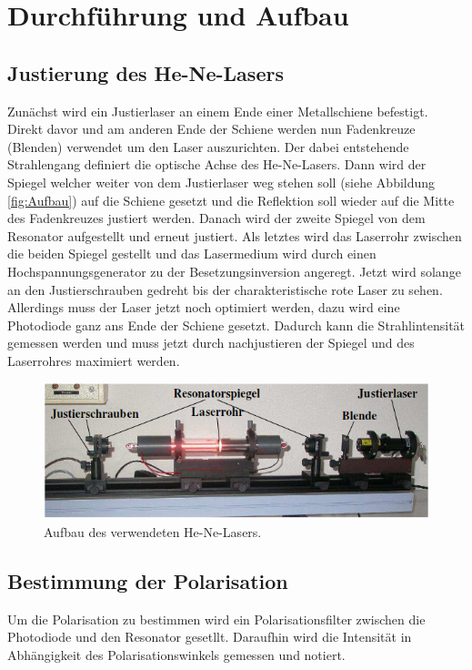 \section{Durchführung und Aufbau}
\label{sec:Durchführung}

\subsection{Justierung des He-Ne-Lasers}
Zunächst wird ein Justierlaser an einem Ende einer Metallschiene befestigt. Direkt davor und am anderen Ende der Schiene werden nun Fadenkreuze (Blenden) verwendet um den Laser auszurichten. Der dabei entstehende Strahlengang definiert die optische Achse des He-Ne-Lasers. Dann wird der Spiegel welcher weiter von dem Justierlaser weg stehen soll (siehe Abbildung \eqref{fig:Aufbau}) auf die Schiene gesetzt und die Reflektion soll wieder auf die Mitte des Fadenkreuzes justiert werden. Danach wird der zweite Spiegel von dem Resonator aufgestellt und erneut justiert. Als letztes wird das Laserrohr zwischen die beiden Spiegel gestellt und das Lasermedium wird durch einen Hochspannungsgenerator zu der Besetzungsinversion angeregt. Jetzt wird solange an den Justierschrauben gedreht bis der charakteristische rote Laser zu sehen. Allerdings muss der Laser jetzt noch optimiert werden, dazu wird eine Photodiode ganz ans Ende der Schiene gesetzt. Dadurch kann die Strahlintensität gemessen werden und muss jetzt durch nachjustieren der Spiegel und des Laserrohres maximiert werden.

\begin{figure}[H]
  \includegraphics[width=\linewidth]{Bilder/Aufbau.png}
  \caption{Aufbau des verwendeten He-Ne-Lasers. \cite{V61}}
  \label{fig:Aufbau}
\end{figure}

\subsection{Bestimmung der Polarisation}
Um die Polarisation zu bestimmen wird ein Polarisationsfilter zwischen die Photodiode und den Resonator gesetllt. Daraufhin wird die Intensität in Abhängigkeit des Polarisationswinkels gemessen und notiert.

